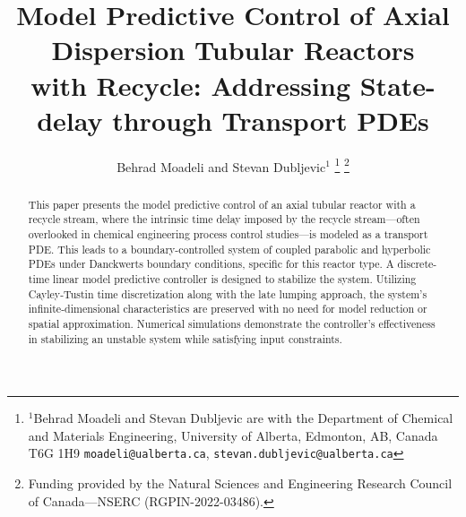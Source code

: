 \documentclass[letterpaper, 10 pt, conference]{ieeeconf}  %
\title{\LARGE \bf
Model Predictive Control of Axial Dispersion Tubular Reactors\\ with Recycle: Addressing State-delay through Transport PDEs
}
\author{Behrad Moadeli and Stevan Dubljevic$^{1}$%
\thanks{$^{1}$Behrad Moadeli and Stevan Dubljevic are with the Department of Chemical and Materials Engineering,
University of Alberta, Edmonton, AB, Canada T6G 1H9
{\tt\small moadeli@ualberta.ca}, {\tt\small stevan.dubljevic@ualberta.ca}}%
\thanks{Funding provided by the Natural Sciences and Engineering Research Council of Canada—NSERC (RGPIN-2022-03486).}%
}
\begin{document}
\maketitle
\thispagestyle{empty}
\pagestyle{empty}


\begin{abstract}

        This paper presents the model predictive control of an axial tubular reactor with a recycle stream, where the intrinsic time delay imposed by the recycle stream—often overlooked in chemical engineering process control studies—is modeled as a transport PDE. This leads to a boundary-controlled system of coupled parabolic and hyperbolic PDEs under Danckwerts boundary conditions, specific for this reactor type. A discrete-time linear model predictive controller is designed to stabilize the system. Utilizing Cayley-Tustin time discretization along with the late lumping approach, the system's infinite-dimensional characteristics are preserved with no need for model reduction or spatial approximation. Numerical simulations demonstrate the controller's effectiveness in stabilizing an unstable system while satisfying input constraints.

\end{abstract}





% 
% 

\balance

\end{document}
